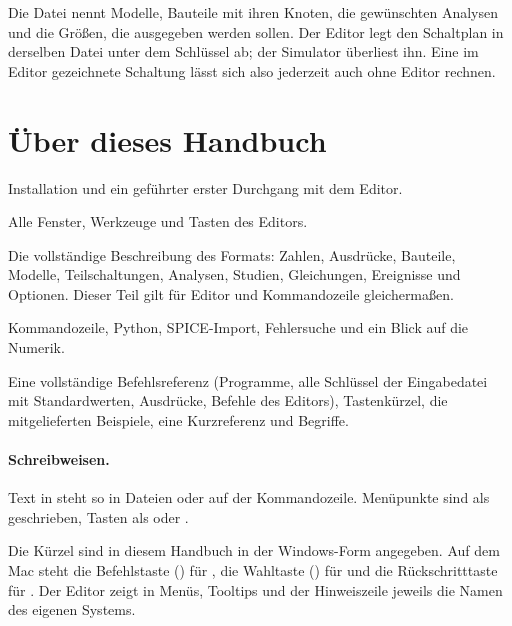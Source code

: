 Die Datei nennt Modelle, Bauteile mit ihren Knoten, die gewünschten
Analysen und die Größen, die ausgegeben werden sollen. Der Editor legt den
Schaltplan in derselben Datei unter dem Schlüssel  ab; der
Simulator überliest ihn. Eine im Editor gezeichnete Schaltung lässt sich
also jederzeit auch ohne Editor rechnen.

\section{Über dieses Handbuch}

\begin{description}[style=nextline,leftmargin=2em]
  \item[Teil I – Grundlagen] Installation und ein geführter erster Durchgang
    mit dem Editor.
  \item[Teil II – Der Editor] Alle Fenster, Werkzeuge und Tasten des
    Editors.
  \item[Teil III – Die Eingabedatei] Die vollständige Beschreibung des
    Formats: Zahlen, Ausdrücke, Bauteile, Modelle, Teilschaltungen,
    Analysen, Studien, Gleichungen, Ereignisse und Optionen. Dieser Teil
    gilt für Editor und Kommandozeile gleichermaßen.
  \item[Teil IV – Werkzeuge und Praxis] Kommandozeile, Python, SPICE-Import,
    Fehlersuche und ein Blick auf die Numerik.
  \item[Anhang] Eine vollständige Befehlsreferenz (Programme, alle
    Schlüssel der Eingabedatei mit Standardwerten, Ausdrücke, Befehle des
    Editors), Tastenkürzel, die mitgelieferten Beispiele, eine Kurzreferenz
    und Begriffe.
\end{description}

\paragraph{Schreibweisen.}
Text in  steht so in Dateien oder auf der
Kommandozeile. Menüpunkte sind als \pfad{}
geschrieben, Tasten als  oder .

\begin{hinweis}
  Die Kürzel sind in diesem Handbuch in der Windows-Form angegeben. Auf dem
  Mac steht die Befehlstaste () für , die Wahltaste
  () für  und die Rückschritttaste für .
  Der Editor zeigt in Menüs, Tooltips und der Hinweiszeile jeweils die
  Namen des eigenen Systems.
\end{hinweis}
